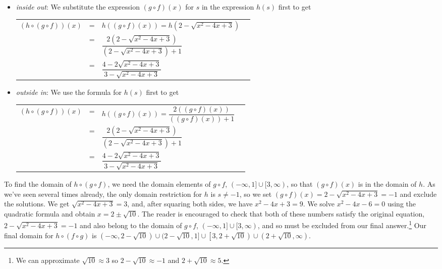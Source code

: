 \documentclass{ximera}
\begin{document}
\begin{example}
\begin{enumerate}
\begin{itemize}

\item  \textit{inside out}: We substitute the expression $(g \circ f)(x)$ for $s$ in the expression $h(s)$ first to get
\begin{longtable}{rclr} $(h \circ (g \circ f))(x)$ & = & $h((g \circ f)(x))=h\left(2 - \sqrt{x^2-4x+3}\right)$  & \\ [5pt]
 & = & $\dfrac{2 \left(2 - \sqrt{x^2-4x+3}\right)}{\left(2 - \sqrt{x^2-4x+3}\right)+1}$ & \\ [20pt]
 & = & $\dfrac{4 - 2\sqrt{x^2-4x+3}}{3 - \sqrt{x^2-4x+3}}$ & \\
 \end{longtable}

\item  \textit{outside in}:  We use the formula for $h(s)$ first to get
\begin{longtable}{rclr} $(h \circ (g \circ f))(x)$ & = & $h((g \circ f)(x))=\dfrac{2 \left( (g \circ f)(x)\right)}{  \left( (g \circ f)(x)\right) + 1}$  & \\ [15pt]
& = & $\dfrac{2 \left(2 - \sqrt{x^2-4x+3}\right)}{\left(2 - \sqrt{x^2-4x+3}\right)+1}$ & \\ [20pt]
 & = & $\dfrac{4 - 2\sqrt{x^2-4x+3}}{3 - \sqrt{x^2-4x+3}}$ & \\
 \end{longtable}
 
 \end{itemize}
 
To find the domain of $h \circ (g \circ f)$, we need the domain elements of $g \circ f$, $(-\infty, 1] \cup [3,\infty)$, so that $(g \circ f)(x)$ is in the domain of $h$.  As we've seen several times already, the only domain restriction for $h$ is $s \neq -1$, so we set  $(g \circ f)(x) = 2 - \sqrt{x^2-4x+3} = -1$ and exclude the solutions.     We get $\sqrt{x^2-4x+3} = 3$, and, after squaring both sides, we have $x^2-4x+3 = 9$.  We solve $x^2-4x-6 = 0$ using the quadratic formula and obtain $x = 2 \pm \sqrt{10}$.  The reader is encouraged to check that both of these numbers satisfy the original equation, $2 - \sqrt{x^2-4x+3} = -1$ and also belong to the domain of $g \circ f$, $(-\infty, 1] \cup [3,\infty)$, and so must be excluded from our final answer.\footnote{We can approximate $\sqrt{10} \approx 3$ so $2-\sqrt{10} \approx -1$ and $2+\sqrt{10} \approx 5$.}   Our final domain for $h \circ (f \circ g)$ is $(-\infty, 2 -\sqrt{10}) \cup (2 - \sqrt{10}, 1] \cup \left[3, 2 + \sqrt{10}\right) \cup \left(2+\sqrt{10}, \infty\right)$.


\end{enumerate}
\end{example}
\end{document}
